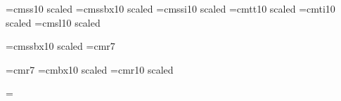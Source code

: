 

\font\tenrm=cmss10 scaled
\font\tenbf=cmssbx10 scaled
\font\teni=cmssi10 scaled
\font\tentt=cmtt10 scaled
\font\tenit=cmti10 scaled
\font\tensl=cmsl10 scaled

\def\fB{\bf}
\def\fD{\rm}
\font\fS=cmssbx10 scaled
\font\fC=cmr7

\font\sevenrm=cmr7                      %
\font\twelvebf=cmbx10 scaled   %
\font\forteenrm=cmr10 scaled   %

\voffset=68pt
\hoffset=0in
\vsize=5.75in
\hsize=9in
\parindent=3pc
\raggedright
{}	%


\def\noICSpaper{\def\maybe{\hrulefill}\def\FootLine{\ICSfoot}}
\def\ICSpaper{\def\maybe{\hss}\def\FootLine{\noICSfoot}}

\def\makeheadline{
    \vbox to 0pt{
	\vskip-102pt
	\line{\vbox to 20pt{}\maybe}
        \line{\vbox to 35pt{}\fS \hss\TitleLine\hss}
	\line{\vbox to 20pt{}\maybe}
	\vss
    }
    \nointerlineskip
}
	
\footline={\FootLine}

\def\MyChap{?}
\gdef\FileName{}

\def\ICSfoot{\hrulefill
    {\fC Copyright $\copyright$ 2001
	NGender Consulting Group.
	All rights reserved.}
    \hrulefill{\tenrm \ \MyChap-\folio}}

\def\noICSfoot{\hss{\tenrm \ \MyChap-\folio\quad}}

\def\VISfooter{\FileName\maybe
    {\fC
        Copyright $\copyright$ 1987
	by Virtual Infinity Systems.
	All rights reserved.
    }
    \maybe{\tenrm \ \MyChap-\folio\quad}
}


\def\SectionNote#1#2{\vskip 10pt\B (#1) #2\par}

\def\Chapter#1#2{\def\MyChap{#1}\NewTitle{Chapter #1.  #2}\ \par}
\def\Section#1#2{\EndFrame\NewTitle{#2}}
\def\NewTitle#1{\def\TitleLine{#1}\def\ContTitle{#1 (con't)}}
\def\EndFrame{\par\vfil\vfil\eject\footline={\FootLine}\vfil}

